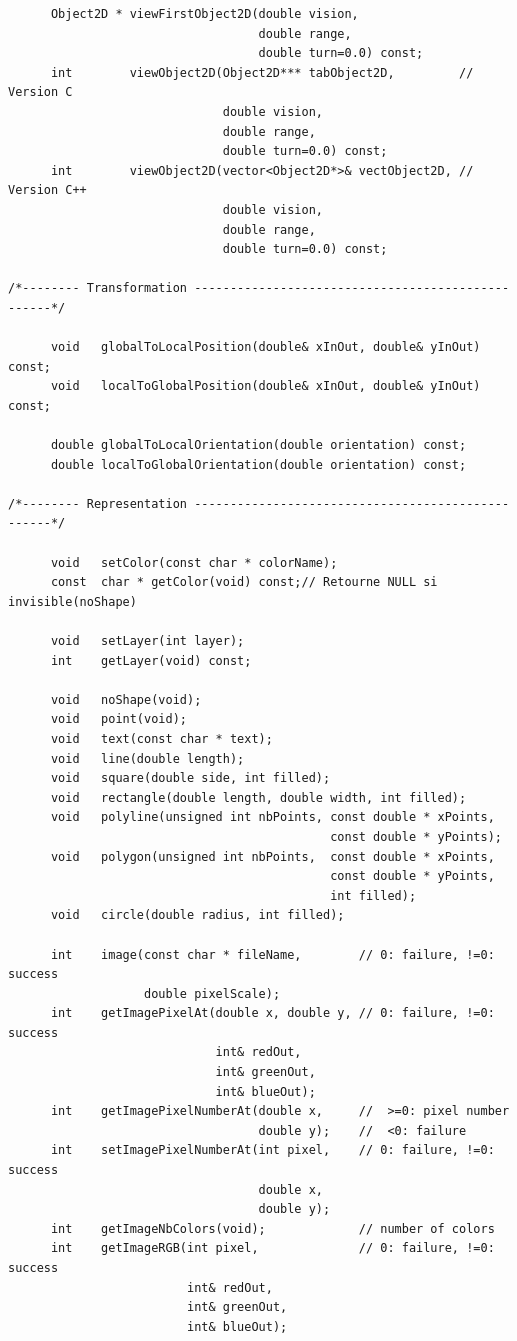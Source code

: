 \documentclass[12pt]{article}
\begin{document}
\begin{small}
\begin{verbatim}
      Object2D * viewFirstObject2D(double vision,
                                   double range,
                                   double turn=0.0) const;
      int        viewObject2D(Object2D*** tabObject2D,         // Version C
                              double vision,
                              double range,
                              double turn=0.0) const;
      int        viewObject2D(vector<Object2D*>& vectObject2D, // Version C++
                              double vision,
                              double range,
                              double turn=0.0) const;

/*-------- Transformation --------------------------------------------------*/

      void   globalToLocalPosition(double& xInOut, double& yInOut) const;
      void   localToGlobalPosition(double& xInOut, double& yInOut) const;

      double globalToLocalOrientation(double orientation) const;
      double localToGlobalOrientation(double orientation) const;

/*-------- Representation --------------------------------------------------*/

      void   setColor(const char * colorName);
      const  char * getColor(void) const;// Retourne NULL si invisible(noShape)

      void   setLayer(int layer);
      int    getLayer(void) const;

      void   noShape(void);
      void   point(void);
      void   text(const char * text);
      void   line(double length);
      void   square(double side, int filled);
      void   rectangle(double length, double width, int filled);
      void   polyline(unsigned int nbPoints, const double * xPoints,
                                             const double * yPoints);
      void   polygon(unsigned int nbPoints,  const double * xPoints,
                                             const double * yPoints,
                                             int filled);
      void   circle(double radius, int filled);

      int    image(const char * fileName,        // 0: failure, !=0: success
                   double pixelScale);
      int    getImagePixelAt(double x, double y, // 0: failure, !=0: success
                             int& redOut,
                             int& greenOut,
                             int& blueOut);
      int    getImagePixelNumberAt(double x,     //  >=0: pixel number 
                                   double y);    //  <0: failure 
      int    setImagePixelNumberAt(int pixel,    // 0: failure, !=0: success
                                   double x,
                                   double y);
      int    getImageNbColors(void);             // number of colors
      int    getImageRGB(int pixel,              // 0: failure, !=0: success
                         int& redOut,
                         int& greenOut,
                         int& blueOut);


\end{verbatim}
\end{small}
\end{document}
